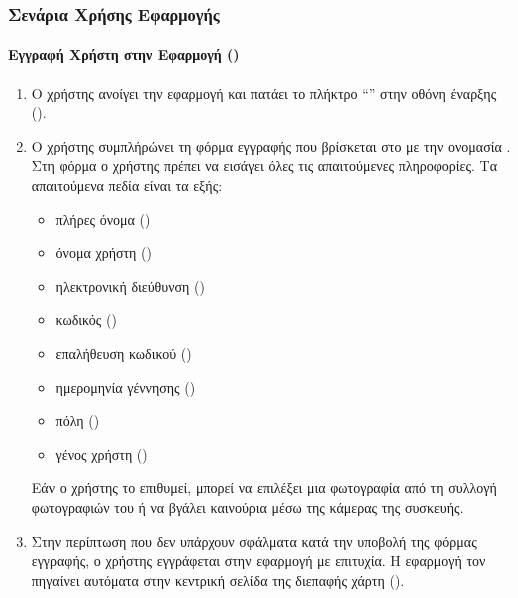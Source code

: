 \subsubsection{Σενάρια Χρήσης Εφαρμογής}

\paragraph{Εγγραφή Χρήστη στην Εφαρμογή (\textit{})}
\begin{enumerate}
    \item Ο χρήστης ανοίγει την εφαρμογή και πατάει το πλήκτρο ``\textit{}'' στην οθόνη έναρξης (\textit{}).
    \item Ο χρήστης συμπλήρώνει τη φόρμα εγγραφής που βρίσκεται στο  με την ονομασία . Στη φόρμα ο χρήστης πρέπει να εισάγει όλες τις απαιτούμενες πληροφορίες. Τα απαιτούμενα πεδία είναι τα εξής:
    \begin{itemize}
        \item πλήρες όνομα (\textit{})
        \item όνομα χρήστη (\textit{})
        \item ηλεκτρονική διεύθυνση (\textit{})
        \item κωδικός (\textit{})
        \item επαλήθευση κωδικού (\textit{})
        \item ημερομηνία γέννησης (\textit{})
        \item πόλη (\textit{})
        \item γένος χρήστη (\textit{})
    \end{itemize}
    Εάν ο χρήστης το επιθυμεί, μπορεί να επιλέξει μια φωτογραφία  από τη συλλογή φωτογραφιών του ή να βγάλει καινούρια μέσω της κάμερας της συσκευής.
    \item Στην περίπτωση που δεν υπάρχουν σφάλματα κατά την υποβολή της φόρμας εγγραφής, ο χρήστης εγγράφεται στην εφαρμογή με επιτυχία. Η εφαρμογή τον πηγαίνει αυτόματα στην κεντρική σελίδα της διεπαφής χάρτη (\textit{}).
\end{enumerate}


